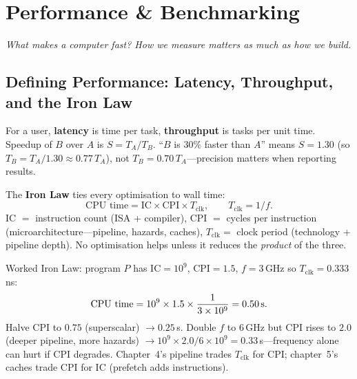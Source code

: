 \chapter{Performance \& Benchmarking}\label{ch:perf}
\begin{center}\small\textit{What makes a computer fast? How we measure matters as much as how we build.}\end{center}

\section{Defining Performance: Latency, Throughput, and the Iron Law}
For a user, \textbf{latency} is time per task, \textbf{throughput} is tasks per unit time. Speedup of $B$ over $A$ is $S=T_A/T_B$. ``$B$ is $30\%$ faster than $A$'' means $S=1.30$ (so $T_B=T_A/1.30\approx0.77\,T_A$), not $T_B=0.70\,T_A$---precision matters when reporting results.

The \textbf{Iron Law} ties every optimisation to wall time:
\[ \text{CPU time} = \text{IC}\times\text{CPI}\times T_{\text{clk}},\qquad T_{\text{clk}}=1/f. \]
IC $=$ instruction count (ISA + compiler), CPI $=$ cycles per instruction (microarchitecture---pipeline, hazards, caches), $T_{\text{clk}}=$ clock period (technology + pipeline depth). No optimisation helps unless it reduces the \emph{product} of the three.

Worked Iron Law: program $P$ has $\text{IC}=10^9$, $\text{CPI}=1.5$, $f=3$\,GHz so $T_{\text{clk}}=0.333$\,ns:
\[ \text{CPU time}=10^9\times1.5\times\frac{1}{3\times10^9}=0.50\text{\,s}. \]
Halve CPI to $0.75$ (superscalar) $\to0.25$\,s. Double $f$ to 6\,GHz but CPI rises to $2.0$ (deeper pipeline, more hazards) $\to10^9\times2.0/6\times10^9=0.33$\,s---frequency alone can hurt if CPI degrades. Chapter~4's pipeline trades $T_{\text{clk}}$ for CPI; chapter~5's caches trade CPI for IC (prefetch adds instructions).

